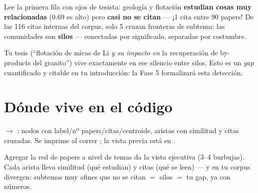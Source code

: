 \documentclass[11pt,a4paper]{article}
\begin{document}
\begin{ojo}
Lee la primera fila con ojos de tesista: geología y flotación \textbf{estudian cosas muy
relacionadas} (0.69 es alto) pero \textbf{casi no se citan} — ¡1 cita entre 90 papers! De
las 116 citas internas del corpus, solo 5 cruzan fronteras de subtema: las comunidades son
\textbf{silos} — conectadas por significado, separadas por costumbre.

Tu tesis (``flotación de micas de Li \emph{y su impacto en} la recuperación de by-products
del granito'') vive exactamente en ese silencio entre silos. Esto es un \emph{gap}
cuantificado y citable en tu introducción: la Fase 5 formalizará esta detección.
\end{ojo}

\section{Dónde vive en el código}

 $\rightarrow$ : nodos con
label/nº papers/citas/centroide, aristas con similitud y citas cruzadas. Se imprime al
correr ; la vista previa está en
.

\begin{resumen}
Agregar la red de papers a nivel de temas da la vista ejecutiva (3--4 burbujas). Cada arista
lleva similitud (qué estudian) y citas (qué se leen) — y en tu corpus divergen: subtemas muy
afines que no se citan $=$ silos $=$ tu gap, ya con números.
\end{resumen}
\end{document}
